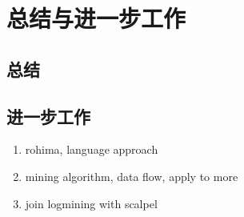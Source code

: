 \chapter{总结与进一步工作}
\label{chap:conclusion}

\section{总结}

\section{进一步工作}

\begin{enumerate}

  \item rohima, language approach

  \item mining algorithm, data flow, apply to more

  \item join logmining with scalpel

\end{enumerate}

